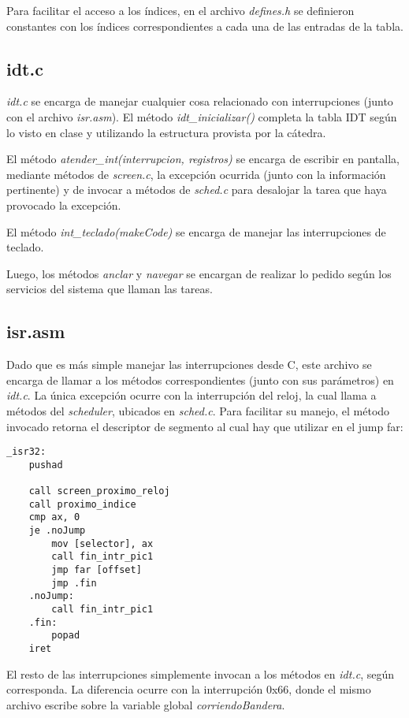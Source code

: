 \documentclass[a4paper]{article}
\newenvironment{codesnippet}{%
	\begin{Sbox}\begin{minipage}{\textwidth}\sffamily\small}%
	{\end{minipage}\end{Sbox}%
		\begin{center}%
		\vspace{-0.4cm}\colorbox{litegrey}{\TheSbox}\end{center}\vspace{0.3cm}}
\begin{document}
Para facilitar el acceso a los índices, en el archivo \textit{defines.h} se definieron constantes con los índices correspondientes a cada una de las entradas de la tabla.

\subsection{idt.c}
\textit{idt.c} se encarga de manejar cualquier cosa relacionado con interrupciones (junto con el archivo \textit{isr.asm}). El método \textit{idt_inicializar()} completa la tabla IDT según lo visto en clase y utilizando la estructura provista por la cátedra.

El método \textit{atender_int(interrupcion, registros)} se encarga de escribir en pantalla, mediante métodos de \textit{screen.c}, la excepción ocurrida (junto con la información pertinente) y de invocar a métodos de \textit{sched.c} para desalojar la tarea que haya provocado la excepción.

El método \textit{int_teclado(makeCode)} se encarga de manejar las interrupciones de teclado.

Luego, los métodos \textit{anclar} y \textit{navegar} se encargan de realizar lo pedido según los servicios del sistema que llaman las tareas.

\subsection{isr.asm}
Dado que es más simple manejar las interrupciones desde C, este archivo se encarga de llamar a los métodos correspondientes (junto con sus parámetros) en \textit{idt.c}. La única excepción ocurre con la interrupción del reloj, la cual llama a métodos del \textit{scheduler}, ubicados en \textit{sched.c}. Para facilitar su manejo, el método invocado retorna el descriptor de segmento al cual hay que utilizar en el jump far:
\begin{codesnippet}
\begin{verbatim}
_isr32:
    pushad

    call screen_proximo_reloj
    call proximo_indice
    cmp ax, 0
    je .noJump
    	mov [selector], ax
    	call fin_intr_pic1
    	jmp far [offset]
    	jmp .fin
    .noJump:
    	call fin_intr_pic1
    .fin:
    	popad
    iret
\end{verbatim}
\end{codesnippet}


El resto de las interrupciones simplemente invocan a los métodos en \textit{idt.c}, según corresponda. La diferencia ocurre con la interrupción 0x66, donde el mismo archivo escribe sobre la variable global \textit{corriendoBandera}.
\end{document}
